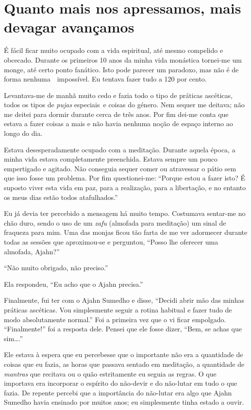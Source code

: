 \section{Quanto mais nos apressamos, mais devagar avançamos}

É fácil ficar muito ocupado com a vida espiritual, até mesmo compelido e
obcecado. Durante os primeiros 10 anos da minha vida monástica tornei-me
um monge, até certo ponto fanático. Isto pode parecer um paradoxo, mas
não é de forma nenhuma~~impossível. Eu tentava fazer tudo a 120 por
cento.

Levantava-me de manhã muito cedo e fazia todo o tipo de práticas
ascéticas, todos os tipos de \emph{pujas} especiais~e coisas do género.
Nem sequer me deitava; não me deitei para dormir durante cerca de três
anos. Por fim dei-me conta que estava a fazer coisas a mais e não havia
nenhuma noção de espaço interno ao longo do dia.

Estava desesperadamente ocupado com a meditação. Durante aquela época, a
minha vida estava completamente preenchida. Estava sempre um pouco
empertigado e agitado. Não conseguia sequer comer ou atravessar o pátio
sem que isso fosse um problema. Por fim questionei-me: ``Porque estou a
fazer isto? É suposto viver esta vida em paz, para a realização, para a
libertação, e no entanto os meus dias estão todos atafulhados.''

Eu já devia ter percebido a mensagem há muito tempo. Costumava sentar-me
no chão duro, sendo o uso de um \emph{zafu} (almofada para meditação) um
sinal de fraqueza para mim. Uma das monjas ficou tão farta de me ver
adormecer durante todas as sessões que aproximou-se e perguntou, ``Posso
lhe oferecer uma almofada, Ajahn?''

``Não muito obrigado, não preciso.''

Ela respondeu, ``Eu acho que o Ajahn precisa.''

Finalmente, fui ter com o Ajahn Sumedho e disse, ``Decidi abrir mão das
minhas práticas ascéticas. Vou simplesmente seguir a rotina habitual e
fazer tudo de modo absolutamente normal.'' Foi a primeira vez que o vi
ficar empolgado. ``Finalmente!'' foi a resposta dele. Pensei que ele
fosse dizer, ``Bem, se achas que sim\ldots{}.''

Ele estava à espera que eu percebesse que o importante não era a
quantidade de coisas que eu fazia, as horas que passava sentado em
meditação, a quantidade de \emph{mantras} que recitava ou o quão
estritamente eu seguia as regras. O que importava era incorporar o
espírito do não-devir e do não-lutar em tudo o que fazia. De repente
percebi que a importância do não-lutar era algo que Ajahn Sumedho havia
ensinado por muitos anos; eu simplesmente tinha estado a ouvir.

